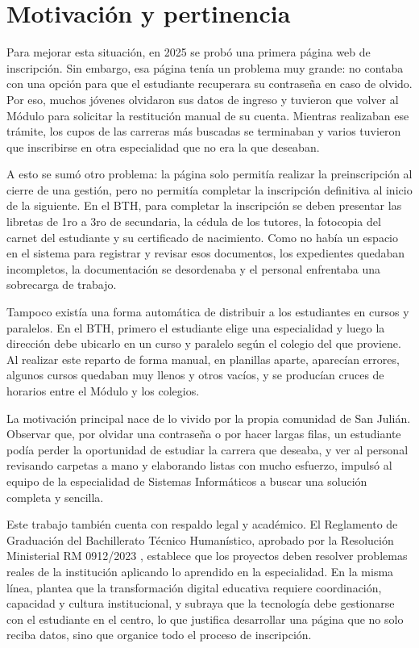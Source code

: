 \section{Motivación y pertinencia}
\label{sec:motivacion_pertinencia}

Para mejorar esta situación, en 2025 se probó una primera página web de inscripción. Sin embargo, esa página tenía un problema muy grande: no contaba con una opción para que el estudiante recuperara su contraseña en caso de olvido. Por eso, muchos jóvenes olvidaron sus datos de ingreso y tuvieron que volver al Módulo para solicitar la restitución manual de su cuenta. Mientras realizaban ese trámite, los cupos de las carreras más buscadas se terminaban y varios tuvieron que inscribirse en otra especialidad que no era la que deseaban.

A esto se sumó otro problema: la página solo permitía realizar la preinscripción al cierre de una gestión, pero no permitía completar la inscripción definitiva al inicio de la siguiente. En el BTH, para completar la inscripción se deben presentar las libretas de 1ro a 3ro de secundaria, la cédula de los tutores, la fotocopia del carnet del estudiante y su certificado de nacimiento. Como no había un espacio en el sistema para registrar y revisar esos documentos, los expedientes quedaban incompletos, la documentación se desordenaba y el personal enfrentaba una sobrecarga de trabajo.

Tampoco existía una forma automática de distribuir a los estudiantes en cursos y paralelos. En el BTH, primero el estudiante elige una especialidad y luego la dirección debe ubicarlo en un curso y paralelo según el colegio del que proviene. Al realizar este reparto de forma manual, en planillas aparte, aparecían errores, algunos cursos quedaban muy llenos y otros vacíos, y se producían cruces de horarios entre el Módulo y los colegios.

La motivación principal nace de lo vivido por la propia comunidad de San Julián. Observar que, por olvidar una contraseña o por hacer largas filas, un estudiante podía perder la oportunidad de estudiar la carrera que deseaba, y ver al personal revisando carpetas a mano y elaborando listas con mucho esfuerzo, impulsó al equipo de la especialidad de Sistemas Informáticos a buscar una solución completa y sencilla.

Este trabajo también cuenta con respaldo legal y académico. El Reglamento de Graduación del Bachillerato Técnico Humanístico, aprobado por la Resolución Ministerial RM 0912/2023 \parencite{ministerioeducacion2023}, establece que los proyectos deben resolver problemas reales de la institución aplicando lo aprendido en la especialidad. En la misma línea, \textcite{unesco2024} plantea que la transformación digital educativa requiere coordinación, capacidad y cultura institucional, y \textcite{unesco2023} subraya que la tecnología debe gestionarse con el estudiante en el centro, lo que justifica desarrollar una página que no solo reciba datos, sino que organice todo el proceso de inscripción.

